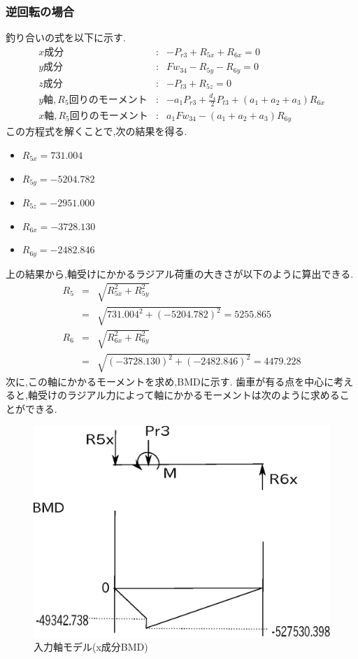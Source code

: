\subsubsection{逆回転の場合}
釣り合いの式を以下に示す.
\begin{eqnarray}
x成分&:&-P_{r3}+R_{5x}+R_{6x}=0\\
y成分&:&Fw_{34}-R_{5y}-R_{6y}=0\\
z成分&:&-P_{t3}+R_{5z}=0\\
y軸,R_5回りのモーメント&:&-a_1P_{r3}+\frac{d_4}{2}P_{t3}+(a_1+a_2+a_3)R_{6x}\\
x軸,R_5回りのモーメント&:&a_1Fw_{34}-(a_1+a_2+a_3)R_{6y}
\end{eqnarray}
この方程式を解くことで,次の結果を得る.
\begin{itemize}
\item $R_{5x}=731.004$
\item $R_{5y}=-5204.782$
\item $R_{5z}=-2951.000$
\item $R_{6x}=-3728.130$
\item $R_{6y}=-2482.846$
\end{itemize}
上の結果から,軸受けにかかるラジアル荷重の大きさが以下のように算出できる.
\begin{eqnarray}
R_5 &=& \sqrt {R_{5x}^2+R_{5y}^2}\\
    &=& \sqrt {731.004^2+(-5204.782)^2}=5255.865\\
R_6 &=& \sqrt {R_{6x}^2+R_{6y}^2}\\
    &=& \sqrt {(-3728.130)^2+(-2482.846)^2}=4479.228
\end{eqnarray}
次に,この軸にかかるモーメントを求め,BMDに示す.
歯車が有る点を中心に考えると,軸受けのラジアル力によって軸にかかるモーメントは次のように求めることができる.
\begin{figure}[htbp]
\begin{center}
\includegraphics[width=12cm]{../picture/jiku342.eps}
\end{center}
\caption{入力軸モデル(x成分BMD)}
\end{figure}
